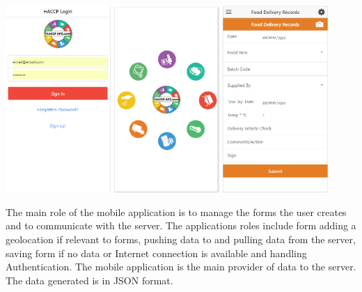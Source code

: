 \begin{center}    
    \includegraphics[width=40mm]{img/mobile/login.png}
    \includegraphics[width=40mm]{img/mobile/menu.png}
    \includegraphics[width=40mm]{img/mobile/foodDeliForm.png}
\end{center}

The main role of the mobile application is to manage the forms the user creates and to communicate with the server. The applications roles include form adding a geolocation if relevant to forms, pushing data to and pulling data from the server, saving form if no data or Internet connection is available and handling Authentication. The mobile application is the main provider of data to the server. The data generated is in JSON format.

